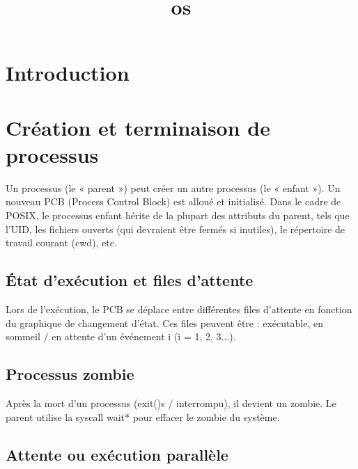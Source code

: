 \documentclass[12pt]{report}
\title{os}
\author{}
\begin{document}
\maketitle
\tableofcontents
\newpage

\section{Introduction}
\section{Création et terminaison de processus}

Un processus (le « parent ») peut créer un autre processus (le « enfant »). Un nouveau PCB (Process Control Block) est alloué et initialisé. Dans le cadre de POSIX, le processus enfant hérite de la plupart des attributs du parent, tels que l'UID, les fichiers ouverts (qui devraient être fermés si inutiles), le répertoire de travail courant (cwd), etc.

\subsection{État d'exécution et files d'attente}

Lors de l'exécution, le PCB se déplace entre différentes files d'attente en fonction du graphique de changement d'état. Ces files peuvent être : exécutable, en sommeil / en attente d'un événement i (i = 1, 2, 3...).

\subsection{Processus zombie}

Après la mort d'un processus (exit()s / interrompu), il devient un zombie. Le parent utilise la syscall wait* pour effacer le zombie du système.

\subsection{Attente ou exécution parallèle}
\end{document}

